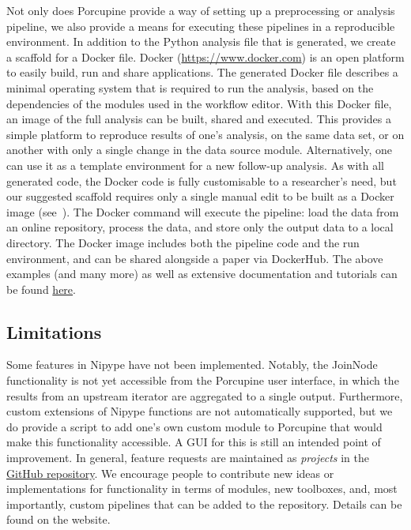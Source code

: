 Not only does Porcupine provide a way of setting up a preprocessing  or analysis pipeline, we also provide a means for executing these pipelines in a reproducible environment. In addition to the Python analysis file that is generated, we create a scaffold for a Docker file. Docker (\url{https://www.docker.com}) is an open platform to easily build, run and share applications. The generated Docker file describes a minimal operating system that is required to run the analysis, based on the dependencies of the modules used in the workflow editor. With this Docker file, an image of the full analysis can be built, shared and executed. This provides a simple platform to reproduce results of one's analysis, on the same data set, or on another with only a single change in the data source module. Alternatively, one can use it as a template environment for a new follow-up analysis. As with all generated code, the Docker code is fully customisable to a researcher's need, but our suggested scaffold requires only a single manual edit to be built as a Docker image (see~). The Docker command will execute the pipeline: load the data from an online repository, process the data, and store only the output data to a local directory. The Docker image includes both the pipeline code and the run environment, and can be shared alongside a paper via DockerHub. The above examples (and many more) as well as extensive documentation and tutorials can be found \href{https://timvanmourik.github.io/Porcupine}{here}.

\subsection{Limitations}
Some features in Nipype have not been implemented. Notably, the JoinNode functionality is not yet accessible from the Porcupine user interface, in which the results from an upstream iterator are aggregated to a single output. Furthermore, custom extensions of Nipype functions are not automatically supported, but we do provide a script to add one's own custom module to Porcupine that would make this functionality accessible. A GUI for this is still an intended point of improvement. In general, feature requests are maintained as  \emph{projects} in the \href{https://github.com/TimVanMourik/Porcupine/projects}{GitHub repository}. We encourage people to contribute new ideas or implementations for functionality in terms of modules, new toolboxes, and, most importantly, custom pipelines that can be added to the repository. Details  can be found on the website.

